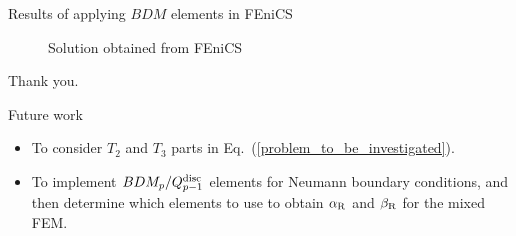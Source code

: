 \documentclass{beamer}
\begin{document}
\begin{frame}{Results of applying $BDM$ elements in FEniCS}
\begin{figure}
\caption{Solution obtained from FEniCS}
\end{figure}
Thank you.
\end{frame}

\begin{frame}{Future work}
\vspace{-10em}
\begin{itemize}
 \item To consider $T_2$ and $T_3$ parts in Eq.~(\ref{problem_to_be_investigated}).
 \item To implement $BDM_p/Q_{p-1}^{\rm disc}$ elements for Neumann boundary conditions, and then determine which elements to use to obtain $\alpha_{\rm R}$ and $\beta_{\rm R}$ for the mixed FEM.
\end{itemize}

\end{frame}
\end{document}
